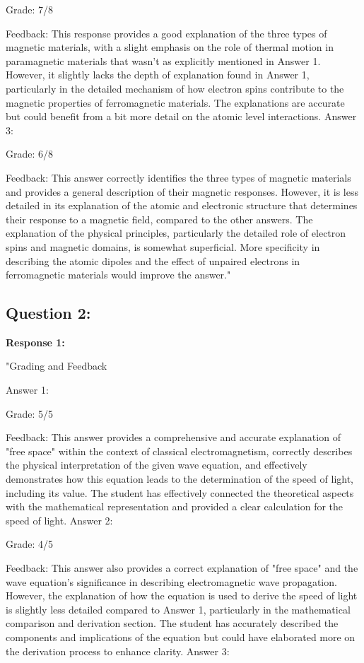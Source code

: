 \documentclass[a4paper,11pt]{article}
\begin{document}
Grade: 7/8

Feedback: This response provides a good explanation of the three types of magnetic materials, with a slight emphasis on the role of thermal motion in paramagnetic materials that wasn't as explicitly mentioned in Answer 1. However, it slightly lacks the depth of explanation found in Answer 1, particularly in the detailed mechanism of how electron spins contribute to the magnetic properties of ferromagnetic materials. The explanations are accurate but could benefit from a bit more detail on the atomic level interactions.
Answer 3:

Grade: 6/8

Feedback: This answer correctly identifies the three types of magnetic materials and provides a general description of their magnetic responses. However, it is less detailed in its explanation of the atomic and electronic structure that determines their response to a magnetic field, compared to the other answers. The explanation of the physical principles, particularly the detailed role of electron spins and magnetic domains, is somewhat superficial. More specificity in describing the atomic dipoles and the effect of unpaired electrons in ferromagnetic materials would improve the answer."

\subsection*{Question 2:}

\textbf{Response 1:}

"Grading and Feedback

Answer 1:

Grade: 5/5

Feedback: This answer provides a comprehensive and accurate explanation of "free space" within the context of classical electromagnetism, correctly describes the physical interpretation of the given wave equation, and effectively demonstrates how this equation leads to the determination of the speed of light, including its value. The student has effectively connected the theoretical aspects with the mathematical representation and provided a clear calculation for the speed of light.
Answer 2:

Grade: 4/5

Feedback: This answer also provides a correct explanation of "free space" and the wave equation's significance in describing electromagnetic wave propagation. However, the explanation of how the equation is used to derive the speed of light is slightly less detailed compared to Answer 1, particularly in the mathematical comparison and derivation section. The student has accurately described the components and implications of the equation but could have elaborated more on the derivation process to enhance clarity.
Answer 3:
\end{document}
